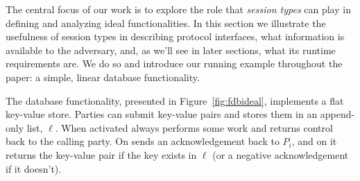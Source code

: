 
The central focus of our work is to explore the role that \emph{session types} can play in defining and analyzing ideal functionalities.
In this section we illustrate the usefulness of session types in describing protocol interfaces, what information is available to the adversary, and, as we'll see in later sections,
what its runtime requirements are. 
We do so and introduce our running example throughout the paper: a simple, linear database functionality.

The database functionality, presented in Figure~\ref{fig:fdbideal}, implements a flat key-value store.
Parties can submit key-value pairs and \Fdb stores them in an append-only list, $\ell$.
When activated \Fdb always performs some work and returns control back to the calling party. 
On  \Fdb sends an acknowledgement back to $P_i$, and on  it returns the key-value pair if the key exists in $\ell$ (or a negative acknowledgement if it doesn't).



